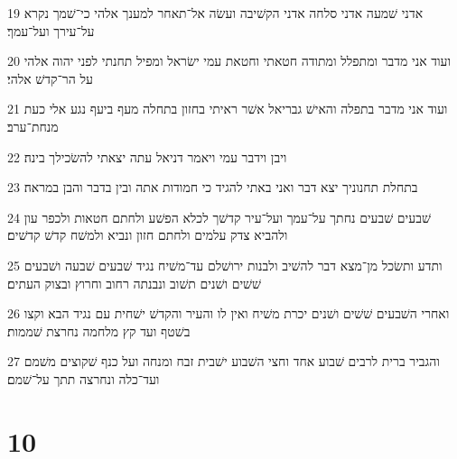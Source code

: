 \par 19 אדני שׁמעה אדני סלחה אדני הקשׁיבה ועשׂה אל־תאחר למענך אלהי כי־שׁמך נקרא על־עירך ועל־עמך׃
\par 20 ועוד אני מדבר ומתפלל ומתודה חטאתי וחטאת עמי ישׂראל ומפיל תחנתי לפני יהוה אלהי על הר־קדשׁ אלהי׃
\par 21 ועוד אני מדבר בתפלה והאישׁ גבריאל אשׁר ראיתי בחזון בתחלה מעף ביעף נגע אלי כעת מנחת־ערב׃
\par 22 ויבן וידבר עמי ויאמר דניאל עתה יצאתי להשׂכילך בינה׃
\par 23 בתחלת תחנוניך יצא דבר ואני באתי להגיד כי חמודות אתה ובין בדבר והבן במראה׃
\par 24 שׁבעים שׁבעים נחתך על־עמך ועל־עיר קדשׁך לכלא הפשׁע ולחתם חטאות ולכפר עון ולהביא צדק עלמים ולחתם חזון ונביא ולמשׁח קדשׁ קדשׁים׃
\par 25 ותדע ותשׂכל מן־מצא דבר להשׁיב ולבנות ירושׁלם עד־משׁיח נגיד שׁבעים שׁבעה ושׁבעים שׁשׁים ושׁנים תשׁוב ונבנתה רחוב וחרוץ ובצוק העתים׃
\par 26 ואחרי השׁבעים שׁשׁים ושׁנים יכרת משׁיח ואין לו והעיר והקדשׁ ישׁחית עם נגיד הבא וקצו בשׁטף ועד קץ מלחמה נחרצת שׁממות׃
\par 27 והגביר ברית לרבים שׁבוע אחד וחצי השׁבוע ישׁבית זבח ומנחה ועל כנף שׁקוצים משׁמם ועד־כלה ונחרצה תתך על־שׁמם׃

\chapter{10}

